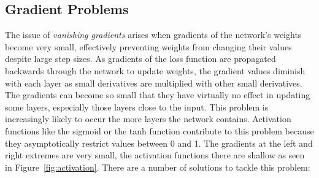 \FloatBarrier
\subsection{Gradient Problems}

The issue of \emph{vanishing gradients} arises when gradients of the network's weights become very small, effectively preventing weights from changing their values despite large step sizes. As gradients of the loss function are propagated backwards through the network to update weights, the gradient values diminish with each layer as small derivatives are multiplied with  other small derivatives. The gradients can become so small that they have virtually no effect in updating some layers, especially those layers close to the input. This problem is increasingly likely to occur the more layers the network contains. Activation functions like the sigmoid or the tanh function contribute to this problem because they asymptotically restrict values between 0 and 1. The gradients at the left and right extremes are very small, the activation functions there are shallow as seen in Figure~\ref{fig:activation}. There are a number of solutions to tackle this problem:

